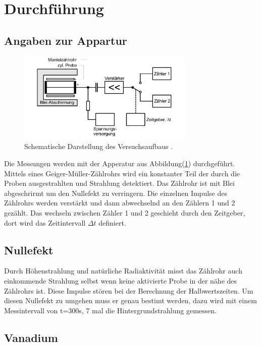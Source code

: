 \section{Durchführung}

\subsection{Angaben zur Appartur}

\begin{figure}[H]
    \centering
    \includegraphics[width=0.75\textwidth]{images/Theorie3.PNG}
    \caption{Schematische Darstellung des Versuchsaufbaus \protect \cite{V702}.}
    \label{img:Apparatur}
 \end{figure}

 \noindent Die Messungen werden mit der Apperatur aus Abbildung(\ref{img:Apparatur}) durchgeführt. Mittels eines Geiger-Müller-Zählrohrs wird ein konstanter 
 Teil der durch die Proben ausgestrahlten \beta und \gamma Strahlung detektiert. Das Zählrohr ist mit Blei abgeschrirmt um den Nullefekt zu verringern.
 Die einzelnen Impulse des Zählrohrs werden verstärkt und dann abwechselnd an den Zählern 1 und 2 gezählt. Das wechseln zwischen Zähler 1 und 2 
 geschieht durch den Zeitgeber, dort wird das Zeitintervall $\Delta t$ definiert.

 \subsection{Nullefekt}

 \noindent Durch Höhenstrahlung und natürliche Radiaktivität misst das Zählrohr auch einkommende Strahlung selbst wenn keine aktivierte Probe in der 
 nähe des Zählrohrs ist. Diese Impulse stören bei der Berechnung der Halbwertszeiten. Um diesen Nullefekt zu umgehen muss er genau bestimt werden, 
 dazu wird mit einem Messintervall von t=300s, 7 mal die Hintergrundstrahlung gemessen.
 

\subsection{Vanadium}

